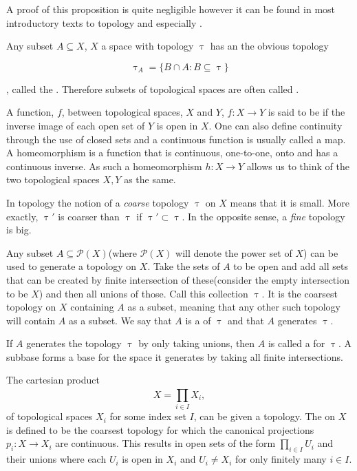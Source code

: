 \documentclass[../../main.tex]{subfiles}
\begin{document}
    A proof of this proposition is quite negligible however it can be found in most introductory texts to topology and especially \cite{armstrong-basictop}.

    Any subset $A \subseteq X$, $X$ a space with topology $\uptau$ has an the obvious topology 

    \begin{equation*}
        \uptau_A = \{B \cap A: B \subseteq \uptau\}
    \end{equation*}

    , called the . Therefore subsets of topological spaces are often called .
    
    A function, $f$, between topological spaces, $X$ and $Y$, $f:X\to Y$ is said to be  if the inverse image of each open set of $Y$ is open in $X$. One can also define continuity through the use of closed sets and a continuous function is usually called a map. A homeomorphism is a function that is continuous, one-to-one, onto and has a continuous inverse. As such a homeomorphism $h:X\to Y$ allows us to think of the two topological spaces $X, Y$ as the same.

    In topology the notion of a \textit{coarse} topology $\uptau$ on $X$ means that it is small. More exactly, $\uptau'$ is coarser than $\uptau$ if $\uptau' \subset \uptau$. In the opposite sense, a \textit{fine} topology is big.
    
    Any subset $A \subseteq \mathcal{P}(X)$(where $\mathcal{P}(X)$ will denote the power set of $X$) can be used to generate a topology on $X$. Take the sets of $A$ to be open and add all sets that can be created by finite intersection of these(consider the empty intersection to be $X$) and then all unions of those. Call this collection $\uptau$. It is the coarsest topology on $X$ containing $A$ as a subset, meaning that any other such topology will contain $A$ as a subset. We say that $A$ is a  of $\uptau$ and that $A$ generates $\uptau$.
    
    If $A$ generates the topology $\uptau$ by only taking unions, then $A$ is called a  for $\uptau$. A subbase forms a base for the space it generates by taking all finite intersections.
    
    \begin{definition}
        The cartesian product $$X=\prod_{i\in I}^{}X_i,$$ of topological spaces $X_i$ for some index set $I$, can be given a topology. The  on $X$ is defined to be the coarsest topology for which the canonical projections $p_i:X\to X_i$ are continuous. This results in open sets of the form $ \prod_{i\in I}U_i$ and their unions where each $U_i$ is open in $X_i$ and $U_i \ne X_i$ for only finitely many $i\in I$.
    \end{definition}
\end{document}
